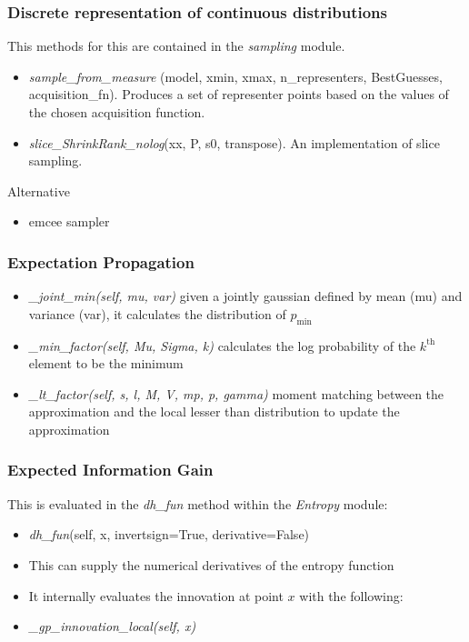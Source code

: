 \documentclass[10pt,handout]{beamer}
\begin{document}
\begin{frame}
\frametitle{Discrete representation of continuous distributions}

This methods for this are contained in the \emph{sampling} module.

\begin{itemize}
  \item \emph{sample\_from\_measure}
  (model, xmin, xmax, n\_representers, BestGuesses, acquisition\_fn). Produces 
  a set of representer points based on the values of the chosen acquisition 
  function.
  
  \item \emph{slice\_ShrinkRank\_nolog}(xx, P, s0, transpose). An implementation
  of slice sampling.
\end{itemize}

Alternative 

\begin{itemize}
\item emcee sampler
\end{itemize}

\end{frame}

\begin{frame}
\frametitle{Expectation Propagation}
\begin{itemize}
  \item\emph{\_joint\_min(self, mu, var)}
  given a jointly gaussian defined by mean (mu) and  variance (var), it calculates the distribution of $p_\text{min}$ 
  \item\emph{\_min\_factor(self, Mu, Sigma, k)}
  calculates the log probability of the $k^\text{th}$ element to be the minimum
  \item\emph{\_lt\_factor(self, s, l, M, V, mp, p, gamma)}
  moment matching between the approximation and the local lesser than distribution to update the approximation
\end{itemize}
\end{frame}

\begin{frame}
\frametitle{Expected Information Gain}

This is evaluated in the \emph{dh\_fun} method within the \emph{Entropy} module:

\begin{itemize}
  \item \emph{dh\_fun}(self, x, invertsign=True, derivative=False)
  \item This can supply the numerical derivatives of the entropy function
  \item It internally evaluates the innovation at point $x$ with the following:
  \item \textit{\_gp\_innovation\_local(self, x)}
\end{itemize}


\end{frame}
\end{document}
